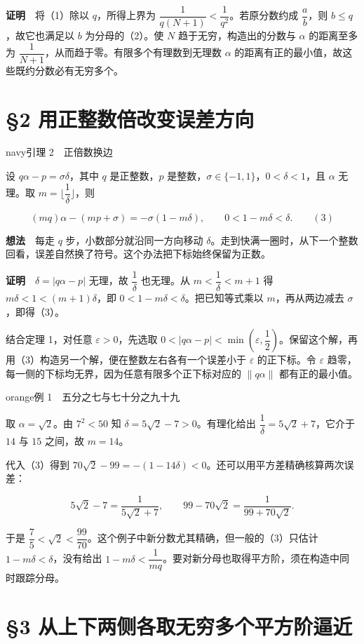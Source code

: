 \documentclass[11pt,a4paper]{article}
\newcommand{\articleheading}[1]{\section{#1}}
\begin{document}
\textbf{证明}　将（1）除以 $q$，所得上界为 $\dfrac1{q(N+1)}<\dfrac1{q^2}$。若原分数约成 $\dfrac ab$，则 $b\le q$，故它也满足以 $b$ 为分母的（2）。使 $N$ 趋于无穷，构造出的分数与 $\alpha$ 的距离至多为 $\dfrac1{N+1}$，从而趋于零。有限多个有理数到无理数 $\alpha$ 的距离有正的最小值，故这些既约分数必有无穷多个。

\clearpage\articleheading{§2 用正整数倍改变误差方向}

\begin{sboxenv}{navy}{引理 2　正倍数换边}

设 $q\alpha-p=\sigma\delta$，其中 $q$ 是正整数，$p$ 是整数，$\sigma\in\{-1,1\}$，$0<\delta<1$，且 $\alpha$ 无理。取 $m=\lfloor\dfrac1\delta\rfloor$，则

\[
(mq)\alpha-(mp+\sigma)=-\sigma(1-m\delta),
\qquad 0<1-m\delta<\delta.\qquad\mathrm{(3)}
\]
\end{sboxenv}

\textbf{想法}　每走 $q$ 步，小数部分就沿同一方向移动 $\delta$。走到快满一圈时，从下一个整数回看，误差自然换了符号。这个办法把下标始终保留为正数。

\textbf{证明}　$\delta=|q\alpha-p|$ 无理，故 $\dfrac1\delta$ 也无理。从 $m<\dfrac1\delta<m+1$ 得 $m\delta<1<(m+1)\delta$，即 $0<1-m\delta<\delta$。把已知等式乘以 $m$，再从两边减去 $\sigma$，即得（3）。

结合定理 1，对任意 $\varepsilon>0$，先选取 $0<|q\alpha-p|<\min(\varepsilon,\dfrac12)$。保留这个解，再用（3）构造另一个解，便在整数左右各有一个误差小于 $\varepsilon$ 的正下标。令 $\varepsilon$ 趋零，每一侧的下标均无界，因为任意有限多个正下标对应的 $\|q\alpha\|$ 都有正的最小值。

\begin{sboxenv}{orange}{例 1　五分之七与七十分之九十九}

取 $\alpha=\sqrt2$。由 $7^2<50$ 知 $\delta=5\sqrt2-7>0$。有理化给出 $\dfrac1\delta=5\sqrt2+7$，它介于 $14$ 与 $15$ 之间，故 $m=14$。
\end{sboxenv}

代入（3）得到 $70\sqrt2-99=-(1-14\delta)<0$。还可以用平方差精确核算两次误差：

\[
5\sqrt2-7=\frac1{5\sqrt2+7},\qquad
99-70\sqrt2=\frac1{99+70\sqrt2}.
\]

于是 $\dfrac75<\sqrt2<\dfrac{99}{70}$。这个例子中新分数尤其精确，但一般的（3）只估计 $1-m\delta<\delta$，没有给出 $1-m\delta<\dfrac1{mq}$。要对新分母也取得平方阶，须在构造中同时跟踪分母。

\clearpage\articleheading{§3 从上下两侧各取无穷多个平方阶逼近}
\end{document}
